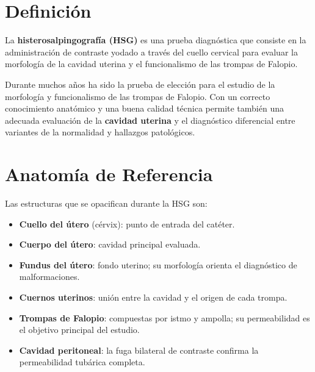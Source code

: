 \section*{Definición}

\begin{cajadefinicion}
La \textbf{histerosalpingografía (HSG)} es una prueba diagnóstica que consiste en la administración de contraste yodado a través del cuello cervical para evaluar la morfología de la cavidad uterina y el funcionalismo de las trompas de Falopio.
\end{cajadefinicion}

Durante muchos años ha sido la prueba de elección para el estudio de la morfología y funcionalismo de las trompas de Falopio. Con un correcto conocimiento anatómico y una buena calidad técnica permite también una adecuada evaluación de la \textbf{cavidad uterina} y el diagnóstico diferencial entre variantes de la normalidad y hallazgos patológicos.

\clearpage

\section*{Anatomía de Referencia}

Las estructuras que se opacifican durante la HSG son:

\begin{itemize}[noitemsep]
  \item \textbf{Cuello del útero} (cérvix): punto de entrada del catéter.
  \item \textbf{Cuerpo del útero}: cavidad principal evaluada.
  \item \textbf{Fundus del útero}: fondo uterino; su morfología orienta el diagnóstico de malformaciones.
  \item \textbf{Cuernos uterinos}: unión entre la cavidad y el origen de cada trompa.
  \item \textbf{Trompas de Falopio}: compuestas por istmo y ampolla; su permeabilidad es el objetivo principal del estudio.
  \item \textbf{Cavidad peritoneal}: la fuga bilateral de contraste confirma la permeabilidad tubárica completa.
\end{itemize}

